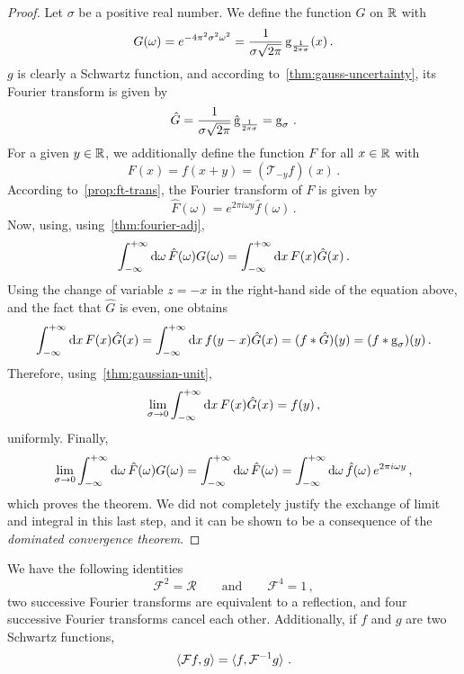 \begin{proof}
  Let $\sigma$ be a positive real number. We define the function $G$ on $\mathbb{R}$ with
  \begin{equation}
    G(\omega)=e^{-4\pi^2\sigma^2\omega^2}
    =\frac{1}{\sigma\sqrt{2\pi}}\operatorname{g}_{\frac{1}{2\pi\sigma}}(x)\,.
  \end{equation}
  $g$ is clearly a Schwartz function, and according to~\cref{thm:gauss-uncertainty}, its
  Fourier transform is given by
  \begin{equation}
    \hat{G}=\frac{1}{\sigma\sqrt{2\pi}}\,\hat{\operatorname{g}}_{\frac{1}{2\pi\sigma}}
    =\operatorname{g}_{\sigma}\,.
  \end{equation}
  For a given $y\in\mathbb{R}$, we additionally define the function $F$ for all $x\in\mathbb{R}$ with
  \begin{equation}
    F(x)=f(x+y)=(\mathcal{T}_{-y}f)(x)\,.
  \end{equation}
  According to~\cref{prop:ft-trans}, the Fourier transform of $F$ is given by
  \begin{equation}
    \hat{F}(\omega)=e^{2\pi i\omega y}\hat{f}(\omega)\,.
  \end{equation}
  Now, using, using~\cref{thm:fourier-adj},
  \begin{equation}
    \int_{-\infty}^{+\infty}\mathrm{d}{\omega}\,\hat{F}(\omega)G(\omega)=\int_{-\infty}^{+\infty}\mathrm{d}{x}\,F(x)\hat{G}(x)\,.
  \end{equation}
  Using the change of variable $z=-x$ in the right-hand side of the equation above, and
  the fact that $\hat{G}$ is even, one obtains
  \begin{equation}
    \int_{-\infty}^{+\infty}\mathrm{d}{x}\,F(x)\hat{G}(x)=\int_{-\infty}^{+\infty}\mathrm{d}{x}\,f(y-x)\hat{G}(x)=(f\ast\hat{G})(y)
    =(f\ast\operatorname{g}_{\sigma})(y)\,.
  \end{equation}
  Therefore, using~\cref{thm:gaussian-unit},
  \begin{equation}
    \lim_{\sigma\to 0}\int_{-\infty}^{+\infty}\mathrm{d}{x}\,F(x)\hat{G}(x)=f(y)\,,
  \end{equation}
  uniformly. Finally,
  \begin{equation}
    \lim_{\sigma\to 0}\int_{-\infty}^{+\infty}\mathrm{d}{\omega}\,\hat{F}(\omega)G(\omega)=
    \int_{-\infty}^{+\infty}\mathrm{d}{\omega}\,\hat{F}(\omega)=\int_{-\infty}^{+\infty}\mathrm{d}{\omega}\,\hat{f}(\omega)\,e^{2\pi i\omega y}\,,
  \end{equation}
  which proves the theorem. We did not completely justify the exchange of limit and
  integral in this last step, and it can be shown to be a consequence of the
  \emph{dominated convergence theorem}.
\end{proof}
\begin{corollary}
  \label{corr:ft-id}
  We have the following identities
  \begin{equation}
    \mathcal{F}^2=\mathcal{R}\qquad\text{and}\qquad\mathcal{F}^4=1\,,
  \end{equation}
  \ie two successive Fourier transforms are equivalent to a reflection, and four
  successive Fourier transforms cancel each other. Additionally, if $f$ and $g$ are two
  Schwartz functions,
  \begin{equation}
    \braket{\mathcal{F}f,g}=\braket{f,\mathcal{F}^{-1}g}\,.
  \end{equation}
\end{corollary}
